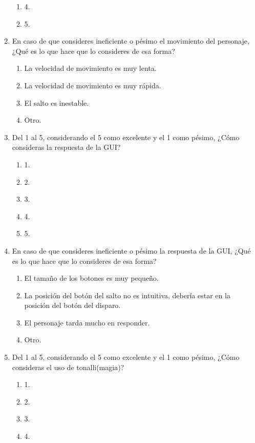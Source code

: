 \begin{enumerate}
\begin{enumerate}
            \item 4.
            \item 5.
        \end{enumerate}
    \item En caso de que consideres ineficiente o pésimo el movimiento del
    personaje, ¿Qué es lo que hace que lo consideres de esa forma?
        \begin{enumerate}
             \item La velocidad de movimiento es muy lenta.
             \item La velocidad de movimiento es muy rápida.
             \item El salto es inestable.
             \item Otro.
        \end{enumerate}
    \item Del 1 al 5, considerando el 5 como excelente y el 1 como pésimo, ¿Cómo
    consideras la respuesta de la GUI?
        \begin{enumerate}
            \item 1.
            \item 2.
            \item 3.
            \item 4.
            \item 5.
        \end{enumerate}
    \item En caso de que consideres ineficiente o pésimo la respuesta de la GUI,
    ¿Qué es lo que hace que lo consideres de esa forma?
        \begin{enumerate}
            \item El tamaño de los botones es muy pequeño.
            \item La posición del botón del salto no es intuitiva,  debería
            estar en la posición del botón del disparo.
            \item El personaje tarda mucho en responder.
            \item Otro.
        \end{enumerate}
    \item Del 1 al 5, considerando el 5 como excelente y el 1 como pésimo, ¿Cómo
    consideras el uso de tonalli(magia)?
        \begin{enumerate}
            \item 1.
            \item 2.
            \item 3.
            \item 4.

\end{enumerate}
\end{enumerate}

